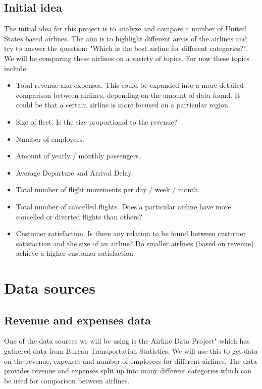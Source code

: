 \documentclass[11pt,oneside]{book}
\begin{document}
\section*{Initial idea}
The initial idea for this project is to analyze and compare a number of United States based airlines. The aim is to highlight different areas of the airlines and try to answer the question: "Which is the best airline for different categories?". 
We will be comparing these airlines on a variety of topics. For now these topics include: 
\begin{itemize}
	\item Total revenue and expenses. This could be expanded into a more detailed comparison between airlines, depending on the amount of data found. It could be that a certain airline is more focused on a particular region. 
	\item Size of fleet. Is the size proportional to the revenue?
	\item Number of employees.
	\item Amount of yearly / monthly passengers.
	\item Average Departure and Arrival Delay. 
	\item Total number of flight movements per day / week / month.
	\item Total number of cancelled flights. Does a particular airline have more cancelled or diverted flights than others?
	\item Customer satisfaction. Is there any relation to be found between customer satisfaction and the size of an airline? Do smaller airlines (based on revenue) achieve a higher customer satisfaction.

\end{itemize}

\chapter{Data sources}
\section*{Revenue and expenses data}
One of the data sources we will be using is the Airline Data Project" \cite{adp} which has gathered data from Bureau Transportation Statistics\cite{bts}. We will use this to get data on the revenue, expenses and number of employees for different airlines. The data provides revenue and expenses split up into many different categories which can be used for comparison between airlines.\\
\end{document}
